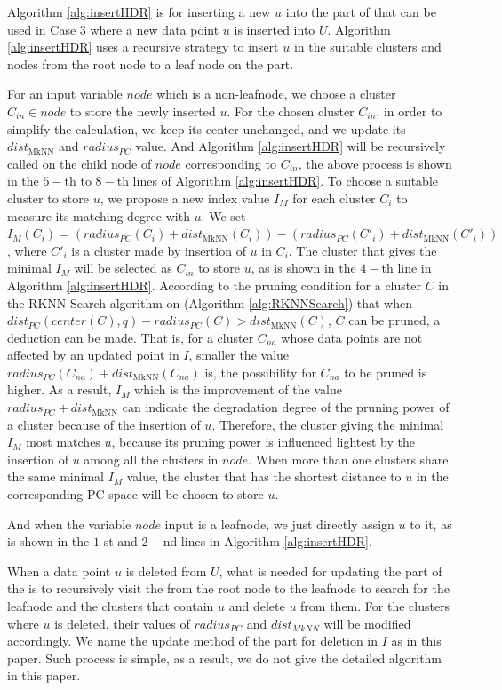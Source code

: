 Algorithm \ref{alg:insertHDR} is for inserting a new $u$ into the \hdrtree part of \dualtree that can be used in Case 3 where a new data point $u$ is inserted into $U$. Algorithm \ref{alg:insertHDR} uses a recursive strategy to insert $u$ in the suitable clusters and nodes from the root node to a leaf node on the \hdrtree part. 

For an input variable $node$ which is a non-leafnode, we choose a cluster $C_{in} \in node$ to store the newly inserted $u$. For the chosen cluster $C_{in}$, in order to simplify the calculation, we keep its center unchanged, and we update its $dist_\text{MkNN}$ and $radius_{PC}$ value. And Algorithm \ref{alg:insertHDR} will be recursively called on the child node of $node$ corresponding to $C_{in}$, the above process is shown in the $5-$th to $8-$th lines of Algorithm \ref{alg:insertHDR}. To choose a suitable cluster to store $u$, we propose a new index value $I_{M}$ for each cluster $C_i$ to measure its matching degree with $u$. We set $I_{M}(C_i)=(radius_{PC}(C_{i})+dist_\text{MkNN}(C_{i}))-(radius_{PC}(C'_{i})+dist_\text{MkNN}(C'_{i}))$, where $C'_i$ is a cluster made by insertion of $u$ in $C_i$. The cluster that gives the minimal $I_{M}$ will be selected as $C_{in}$ to store $u$, as is shown in the $4-$th line in Algorithm \ref{alg:insertHDR}. According to the pruning condition for a cluster $C$ in the RKNN Search algorithm on \dualtree (Algorithm \ref{alg:RKNNSearch}) that when $dist_{PC}(center(C), q) - radius_{PC}(C)> dist_\text{MkNN}(C)$, $C$ can be pruned, a deduction can be made. That is, for a cluster $C_{na}$ whose data points are not affected by an updated point in $I$, smaller the value  $radius_{PC}(C_{na})+dist_\text{MkNN}(C_{na})$ is, the possibility for $C_{na}$ to be pruned is higher. As a result, $I_{M}$ which is the improvement of the value $radius_{PC}+dist_\text{MkNN}$ can indicate the degradation degree of the pruning power of a cluster because of the insertion of $u$. Therefore, the cluster giving the minimal $I_{M}$ most matches $u$, because its pruning power is influenced lightest by the insertion of $u$ among all the clusters in $node$. When more than one clusters share the same minimal $I_{M}$ value, the cluster that has the shortest distance to $u$ in the corresponding PC space will be chosen to store $u$. 

And when the variable $node$ input is a leafnode, we just directly assign $u$ to it, as is shown in the $1$-st and $2-$nd lines in Algorithm \ref{alg:insertHDR}. 

When a data point $u$ is deleted from $U$, what is needed for updating the \hdrtree part of the \dualtree is to recursively visit the \hdrtree from the root node to the leafnode to search for the leafnode and the clusters that contain $u$ and delete $u$ from them. For the clusters where $u$ is deleted, their values of $radius_{PC}$ and $dist_{MkNN}$ will be modified accordingly. We name the update method of the \hdrtree part for deletion in $I$ as  in this paper. Such process is simple, as a result, we do not give the detailed algorithm in this paper. 






